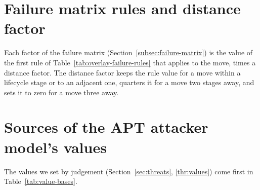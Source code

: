 \documentclass{cshonours}
\begin{document}

\FloatBarrier

\section{Failure matrix rules and distance factor}
\label{app:weight-sets}

Each factor of the failure matrix (Section~\ref{subsec:failure-matrix}) is
the value of the first rule of Table~\ref{tab:overlay-failure-rules} that
applies to the move, times a distance factor. The distance factor keeps the rule
value for a move within a lifecycle stage or to an adjacent one, quarters it
for a move two stages away, and sets it to zero for a move three away.



\FloatBarrier

\section{Sources of the APT attacker model's values}

The values we set by judgement (Section~\ref{sec:threats}, \ref{thr:values})
come first in Table~\ref{tab:value-bases}.
\end{document}
